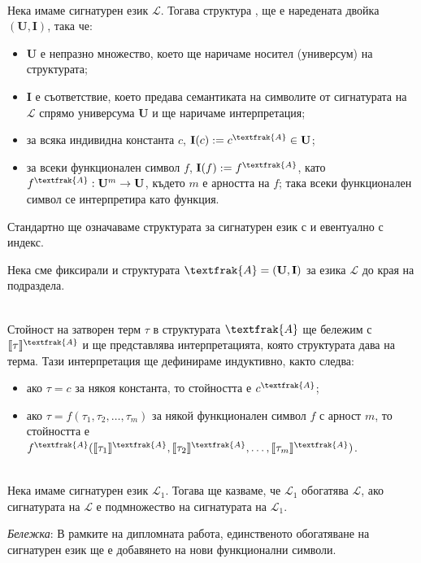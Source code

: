 \documentclass[12pt,twoside,a4paper]{article}
\begin{document}
	\begin{definition}\label{def:struct}~\\
		\indent Нека имаме сигнатурен език $\mathcal{L}$. Тогава структура , ще е наредената двойка $(\mathbf{U}, \mathbf{I})$, така че:
		\begin{itemize}
			\item $\mathbf{U}$ е непразно множество, което ще наричаме носител (универсум) на структурата;
			\item $\mathbf{I}$ е съответствие, което предава семантиката на символите от сигнатурата на $\mathcal{L}$ спрямо универсума $\mathbf{U}$ и ще наричаме интерпретация;
			\item за всяка индивидна константа $c$, $\mathbf{I}(c) := c^\textfrak{A} \in \mathbf{U}$;
			\item за всеки функционален символ $f$, $\mathbf{I}(f) := f^\textfrak{A}$, като $f^\textfrak{A}: \mathbf{U}^m \to \mathbf{U}$, където $m$ е арността на $f$; така всеки функционален символ се интерпретира като функция.
		\end{itemize}
		
		Стандартно ще означаваме структурата за сигнатурен език с  и евентуално  с индекс.
	\end{definition}
	
	Нека сме фиксирали и структурата $\textfrak{A} = (\mathbf{U}, \mathbf{I})$ за езика $\mathcal{L}$ до края на подраздела.
	
	\begin{definition}~\\
		\indent Стойност на затворен терм $\tau$ в структурата $\textfrak{A}$ ще бележим с $\llbracket\tau\rrbracket^\textfrak{A}$ и ще представлява интерпретацията, която структурата дава на терма. Тази интерпретация ще дефинираме индуктивно, както следва:
		\begin{itemize}
			\item ако $\tau = c$ за някоя константа, то стойността е $c^\textfrak{A}$;
			\item ако $\tau = f(\tau_1,\tau_2,\dots,\tau_m)$ за някой функционален символ $f$ с арност $m$, то стойността е $f^\textfrak{A}(\llbracket\tau_1\rrbracket^\textfrak{A},\llbracket\tau_2\rrbracket^\textfrak{A},\dots,\llbracket\tau_m\rrbracket^\textfrak{A})$.
		\end{itemize}
	\end{definition}
	
	\begin{definition}~\\
		\indent Нека имаме сигнатурен език $\mathcal{L}_1$. Тогава ще казваме, че $\mathcal{L}_1$ обогатява $\mathcal{L}$, ако сигнатурата на $\mathcal{L}$ е подмножество на сигнатурата на $\mathcal{L}_1$.
		
		\textit{Бележка}: В рамките на дипломната работа, единственото обогатяване на сигнатурен език ще е добавянето на нови функционални символи.
	\end{definition}
	
\end{document}
